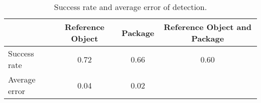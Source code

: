 \begin{table}%
\centering
\begin{tabular}{@{} l *3c @{}}
\toprule
 & {Reference Object}  & {Package}  & {Reference Object and Package}  \\ 
\midrule
Success rate & 0.72 & 0.66 & 0.60 \\ 
Average error & 0.04 & 0.02 & \\
\bottomrule
 \end{tabular}
 \caption{Success rate and average error of detection.}
\label{table:detection_overall}
\end{table}